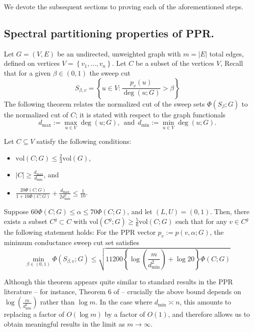 \documentclass[11pt,twoside]{article}
\newcommand{\set}[1]{\left\{#1\right\}}
\newcommand{\vol}{\mathrm{vol}}
\newcommand{\abs}[1]{\left \lvert #1 \right \rvert}
\newcommand{\1}{\mathbbm{1}}
\begin{document}
We devote the subsequent sections to proving each of the aforementioned steps.

\subsection{Spectral partitioning properties of PPR.}

Let $G = (V,E)$ be an undirected, unweighted graph with $m = \abs{E}$ total edges, defined on vertices $V = \set{v_1, \ldots, v_n}$. Let $C$ be a subset of the vertices $V$, Recall that for a given $\beta \in (0,1)$ the sweep cut 
\begin{equation*}
S_{\beta,v} = \set{u \in V: \frac{p_v(u)}{\deg(u;G)} > \beta}
\end{equation*} 
The following theorem relates the normalized cut of the sweep sets $\Phi(S_{\beta};G)$ to the normalized cut of $C$; it is stated with respect to the graph functionals 
\begin{equation*}
d_{\max} := \max_{u \in V} \deg(u;G), ~~\textrm{and}~~ d_{\min} := \min_{u \in V} \deg(u;G).
\end{equation*}
\begin{theorem}
	\label{thm:conductance_ppr}
	Let $C \subseteq V$ satisfy the following conditions:
	\begin{itemize}
		\item $\vol(C;G) \leq \frac{2}{3}\vol(G)$,
		\item $\abs{C} \geq \frac{d_{\max}}{d_{\min}}$, and
		\item $\frac{20\Phi(C;G)}{1 + 10\Phi(C;G)} + \frac{d_{\max}}{2d_{\min}^2} \leq \frac{1}{10}$.
	\end{itemize}
	Suppose $60\Phi(C;G) \leq \alpha \leq 70\Phi(C;G)$, and let $(L,U) = (0,1)$. Then, there exists a subset $C^g \subset C$ with $\vol(C^g;G) \geq \frac{5}{6}\vol(C;G)$ such that for any $v \in C^g$ the following statement holds: For the PPR vector $p_v := p(v,\alpha;G)$, the minimum conductance sweep cut set satisfies 
	\begin{equation*}
	\min_{\beta \in (0,1)}\Phi(S_{\beta,v};G) \leq \sqrt{11200\left\{\log\left(\frac{m}{d_{\min}^2}\right) + \log 20\right\} \Phi(C;G)}
	\end{equation*}
\end{theorem}
Although this theorem appears quite similar to standard results in the PPR literature -- for instance, Theorem 6 of \citet{andersen2006} -- crucially the above bound depends on $\log\left(\frac{m}{d_{\min}^2}\right)$ rather than $\log m$. In the case where $d_{\min} \asymp n$, this amounts to replacing a factor of $O(\log m)$ by a factor of ${O}(1)$, and therefore allows us to obtain meaningful results in the limit as $m \to \infty$. 
\end{document}

